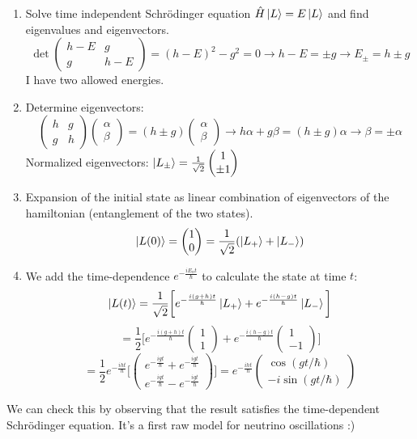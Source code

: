 \begin{enumerate}
    \item Solve time independent Schr\"odinger equation $\hat{H}\ket{L}=E\ket{L}$ and find eigenvalues and eigenvectors.
    \[
    \det\begin{pmatrix}h-E&g\\g&h-E\end{pmatrix}=(h-E)^2-g^2=0 \rightarrow h-E=\pm g \rightarrow E_{\pm}=h\pm g
    \]
    I have two allowed energies.
    \item Determine eigenvectors:
    \[
    \begin{pmatrix}h&g\\g&h\end{pmatrix}\begin{pmatrix}\alpha\\\beta\end{pmatrix}=(h\pm g)\begin{pmatrix}\alpha\\\beta\end{pmatrix} \rightarrow h\alpha + g\beta = (h\pm g)\alpha \rightarrow \beta = \pm\alpha
    \]
    Normalized eigenvectors: $\ket{L_{\pm}}=\frac{1}{\sqrt{2}}\begin{pmatrix}1\\\pm 1\end{pmatrix}$
    \item Expansion of the initial state as linear combination of eigenvectors of the hamiltonian (entanglement of the two states).
    \[
    \ket{L(0)}=\begin{pmatrix}1\\0\end{pmatrix}=\frac{1}{\sqrt{2}}(\ket{L_+}+\ket{L_-})
    \]
    \item We add the time-dependence $e^{-\frac{iE_nt}{\hbar}}$ to calculate the state at time $t$:
    \[
    \ket{L(t)}=\frac{1}{\sqrt{2}}\bigg[e^{-\frac{i(g+h)t}{\hbar}}\ket{L_+}+e^{-\frac{i(h-g)t}{\hbar}}\ket{L_-}\bigg]
    \]
    \[
    =\frac{1}{2}\bigg[e^{-\frac{i(g+h)t}{\hbar}}\begin{pmatrix}1\\1\end{pmatrix}+e^{-\frac{i(h-g)t}{\hbar}}\begin{pmatrix}1\\-1\end{pmatrix}\bigg]
    \]
    \[
    =\frac{1}{2}e^{-\frac{iht}{\hbar}}\bigg[\begin{pmatrix}e^{-\frac{igt}{\hbar}}+e^{-\frac{igt}{\hbar}}\\e^{-\frac{igt}{\hbar}}-e^{-\frac{igt}{\hbar}}\end{pmatrix}\bigg]
    =e^{-\frac{iht}{\hbar}}
    \begin{pmatrix}
    \cos (gt/\hbar)\\
    -i\sin (gt/\hbar)
    \end{pmatrix}
    \]
\end{enumerate}
We can check this by observing that the result satisfies the time-dependent Schr\"odinger equation. It's a first raw model for neutrino oscillations :)
